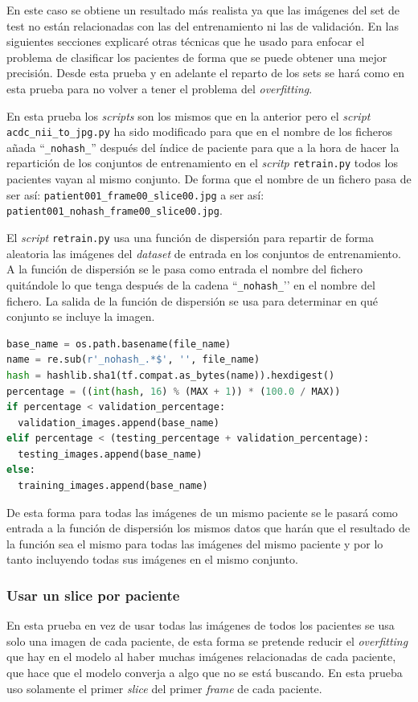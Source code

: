 \documentclass[12pt,a4paper]{article}
\begin{document}
En este caso se obtiene un resultado más realista ya que las imágenes del set de test no están relacionadas con las del entrenamiento ni las de validación. En las siguientes secciones explicaré otras técnicas que he usado para enfocar el problema de clasificar los pacientes de forma que se puede obtener una mejor precisión. Desde esta prueba y en adelante el reparto de los sets se hará como en esta prueba para no volver a tener el problema del \textit{overfitting}.
\bigskip

En esta prueba los \textit{scripts} son los mismos que en la anterior pero el \textit{script} \texttt{acdc\_nii\_to\_jpg.py} ha sido modificado para que en el nombre de los ficheros añada ``\texttt{\_nohash\_}'' después del índice de paciente para que a la hora de hacer la repartición de los conjuntos de entrenamiento en el \textit{scritp} \texttt{retrain.py} todos los pacientes vayan al mismo conjunto. De forma que el nombre de un fichero pasa de ser así: \texttt{patient001\_frame00\_slice00.jpg} a ser así: \texttt{patient001\_nohash\_frame00\_slice00.jpg}.
\bigskip

El \textit{script} \texttt{retrain.py} usa una función de dispersión para repartir de forma aleatoria las imágenes del \textit{dataset} de entrada en los conjuntos de entrenamiento. A la función de dispersión se le pasa como entrada el nombre del fichero quitándole lo que tenga después de la cadena ``\texttt{\_nohash\_}’’ en el nombre del fichero. La salida de la función de dispersión se usa para determinar en qué conjunto se incluye la imagen.

\begin{lstlisting}[language=Python]
base_name = os.path.basename(file_name)
name = re.sub(r'_nohash_.*$', '', file_name)
hash = hashlib.sha1(tf.compat.as_bytes(name)).hexdigest()
percentage = ((int(hash, 16) % (MAX + 1)) * (100.0 / MAX))
if percentage < validation_percentage:
  validation_images.append(base_name)
elif percentage < (testing_percentage + validation_percentage):
  testing_images.append(base_name)
else:
  training_images.append(base_name)
\end{lstlisting}

De esta forma para todas las imágenes de un mismo paciente se le pasará como entrada a la función de dispersión los mismos datos que harán que el resultado de la función sea el mismo para todas las imágenes del mismo paciente y por lo tanto incluyendo todas sus imágenes en el mismo conjunto.

\subsubsection{Usar un slice por paciente}
En esta prueba en vez de usar todas las imágenes de todos los pacientes se usa solo una imagen de cada paciente, de esta forma se pretende reducir el \textit{overfitting} que hay en el modelo al haber muchas imágenes relacionadas de cada paciente, que hace que el modelo converja a algo que no se está buscando. En esta prueba uso solamente el primer \textit{slice} del primer \textit{frame} de cada paciente.
\end{document}
